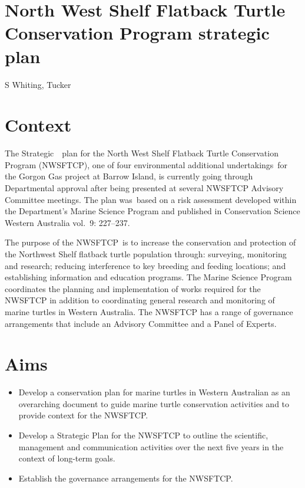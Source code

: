 \documentclass[version=last,
    paper=a4, %
    10pt, %
    usenames,
    dvipsnames,
    oneside, %
    headings=openany, %
    DIV=15 %
]{scrbook}
\begin{document}
\section*{North West Shelf Flatback Turtle Conservation Program strategic plan
}

S Whiting, Tucker


\section*{Context}
The Strategic~~plan for the North West Shelf Flatback Turtle
Conservation Program (NWSFTCP), one of four environmental additional
undertakings~for the Gorgon Gas project at Barrow Island, is currently
going through Departmental approval after being presented at several
NWSFTCP Advisory Committee meetings. The plan was~based on a risk
assessment developed within the Department's Marine Science Program and
published in Conservation Science Western Australia vol.~9: 227--237.~

The purpose of the NWSFTCP~is to increase the conservation and
protection of the Northwest Shelf flatback turtle population through:
surveying, monitoring and research; reducing interference to key
breeding and feeding locations; and establishing information and
education programs. The Marine Science Program coordinates the planning
and implementation of works required for the NWSFTCP in addition to
coordinating general research and monitoring of marine turtles in
Western Australia. The NWSFTCP has a range of governance arrangements
that include an Advisory Committee and a Panel of Experts.~



\section*{Aims}
\begin{itemize}
\itemsep1pt\parskip0pt
\item
  Develop a conservation plan for marine turtles in Western Australian
  as an overarching document to guide marine turtle conservation
  activities and to provide context for the NWSFTCP.
\item
  Develop a Strategic Plan for the NWSFTCP to outline the scientific,
  management and communication activities over the next five years in
  the context of long-term goals.
\item
  Establish the governance arrangements for the NWSFTCP.
\end{itemize}
\end{document}
